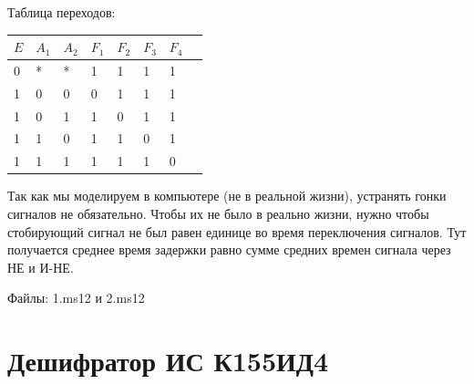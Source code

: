\documentclass[a4paper,12pt]{article}
\begin{document}
\begin{center}
	Таблица переходов:
	\begin{center}
		\begin{tabular}{ | l | l | l | l | l | l | l | p{1cm} |}
			\hline
			$E$ & $A_{1}$ & $A_{2}$ & $F_{1}$ & $F_{2} $ & $F_{3}$ & $F_{4}$ \\ \hline
			0 & * & * & 1 & 1 & 1 & 1\\ \hline
			1 & 0 & 0 & 0 & 1 & 1 & 1\\ \hline
			
			1 & 0 & 1 & 1 & 0 & 1 & 1\\ \hline 
			1 & 1 & 0 & 1 & 1 & 0 & 1\\ \hline
			
			1 & 1 & 1 & 1 & 1 & 1 & 0 \\ 
			\hline
		\end{tabular}
	\end{center}
\end{center}

\noindent Так как мы моделируем в компьютере (не в реальной жизни), устранять гонки сигналов не обязательно. Чтобы их не было в реально жизни, нужно чтобы стобирующий сигнал не был равен единице во время переключения сигналов. Тут получается среднее время задержки равно сумме средних времен сигнала через НЕ и И-НЕ.\newline

\noindent Файлы: 1.ms12 и 2.ms12

\clearpage
\section{Дешифратор ИС К155ИД4}
\end{document}
